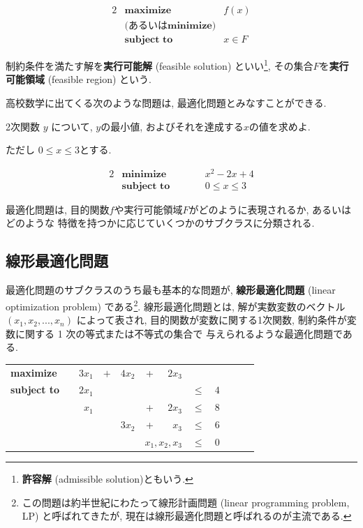 \documentclass[a4paper,11pt,dvipdfmx]{jsarticle}
\begin{document}
\begin{shadebox}
    \begin{alignat*}{2}
    &\textbf{maximize} \quad &f(x)   \\
    &\text{(あるいは}\textbf{minimize})&  \\
    &\textbf{subject to} &x \in F 
    \end{alignat*}
\end{shadebox}

制約条件を満たす解を\textbf{実行可能解} (feasible solution) といい\footnote{\textbf{許容解} (admissible solution)ともいう. }, その集合$F$を\textbf{実行可能領域} (feasible region) という.

高校数学に出てくる次のような問題は, 最適化問題とみなすことができる.

2次関数 $y$ について, $y$の最小値, およびそれを達成する$x$の値を求めよ. 

\centerline{ただし $0 \leq x \leq 3$とする.}

\begin{screen}
    \begin{alignat*}{2}
    &\textbf{minimize}& \qquad & x^2-2x+4 \\
    &\textbf{subject to}& \qquad & 0\leq x \leq 3
    \end{alignat*}
\end{screen}
最適化問題は, 目的関数$f$や実行可能領域$F$がどのように表現されるか, あるいはどのような 特徴を持つかに応じていくつかのサブクラスに分類される.

\subsection{線形最適化問題}
最適化問題のサブクラスのうち最も基本的な問題が, \textbf{線形最適化問題} (linear optimization problem) である\footnote{この問題は約半世紀にわたって線形計画問題 (linear programming problem, LP) と呼ばれてきたが, 
現在は線形最適化問題と呼ばれるのが主流である. }. 
線形最適化問題とは, 解が実数変数のベクトル $(x_1, x_2, . . . , x_n)$ によって表され, 目的関数が変数に関する1次関数, 
制約条件が変数に関する 1 次の等式または不等式の集合で 与えられるような最適化問題である.

\begin{shadebox}
    \centering
    \begin{tabular}{l c r c r c r c c l l l}
        \textbf{maximize}   &  & $3x_1$ & $+$ & $4x_2$ & +              & $2x_3$             &      &   &  &  &  \\
        \textbf{subject to} &  & $2x_1$ &     &        &                &                    & $\leq$ & $4$ &  &  &  \\
                            &  & $x_1$  &     &        & +              & $2x_3$             & $\leq$ & $8$ &  &  &  \\
                            &  &        &     & $3x_2$ & +              & $x_3$              & $\leq$ & $6$ &  &  &  \\
                            &  &        &     &        & \multicolumn{2}{l}{$x_1, x_2, x_3$} & $\leq$ & $0$ &  &  & 
    \end{tabular}
\end{shadebox}
\end{document}
